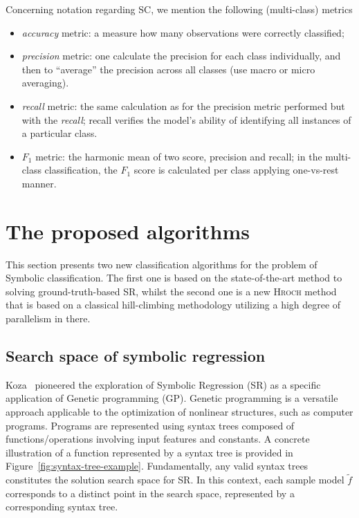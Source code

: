 \documentclass{bmcart}
\begin{document}
Concerning notation regarding SC, we mention the following (multi-class) metrics  %
\begin{itemize}
    \item \emph{accuracy} metric: a measure how many observations were correctly classified;
    \item   \emph{precision} metric: one calculate the precision for each class individually, and then to ``average'' the precision  across all classes (use macro or micro averaging).
    \item  \emph{recall} metric: the same calculation as for the precision metric performed but with the \emph{recall}; recall verifies the model's ability of identifying all instances of a particular class. 
    \item $F_1$ metric: the harmonic mean of two score, precision and recall; in the multi-class classification, the $F_1$ score is calculated per class applying one-vs-rest manner. 
       
\end{itemize}
 
 	\section{The proposed algorithms}\label{sec:rils}

 This section presents two new classification algorithms for the problem of Symbolic classification. The first one is based on the state-of-the-art method to solving ground-truth-based SR, whilst the second one is a new \textsc{Hroch} method that is based on a classical hill-climbing methodology utilizing a high degree of parallelism in there. 
 

\subsection{Search space of symbolic regression} 
 
Koza~\cite{koza1994genetic} pioneered the exploration of Symbolic Regression (SR) as a specific application of Genetic programming (GP). Genetic programming is a versatile approach applicable to the optimization of nonlinear structures, such as computer programs. Programs are represented using syntax trees composed of functions/operations involving input features and constants. A concrete illustration of a function represented by a syntax tree is provided in Figure~\ref{fig:syntax-tree-example}. Fundamentally, any valid syntax trees constitutes the solution search space for SR. In this context, each sample model $\tilde{f}$ corresponds to a distinct point in the search space, represented by a corresponding syntax tree.
\end{document}
